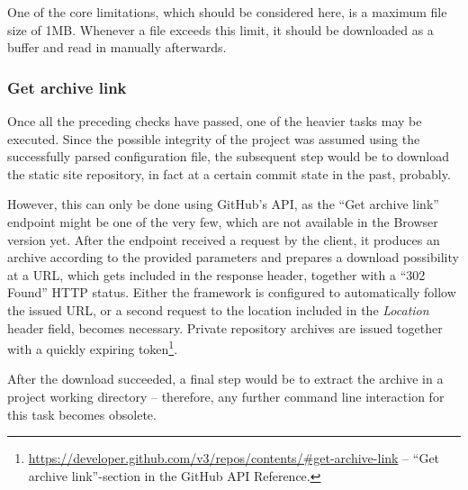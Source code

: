 One of the core limitations, which should be considered here, is a maximum file size of 1MB. Whenever a file exceeds this limit, it should be downloaded as a buffer and read in manually afterwards.

\subsubsection{Get archive link}
Once all the preceding checks have passed, one of the heavier tasks may be executed. Since the possible integrity of the project was assumed using the successfully parsed configuration file, the subsequent step would be to download the static site repository, in fact at a certain commit state in the past, probably.

However, this can only be done using GitHub's API, as the ``Get archive link'' endpoint might be one of the very few, which are not available in the Browser version yet. After the endpoint received a request by the client, it produces an archive according to the provided parameters and prepares a download possibility at a URL, which gets included in the response header, together with a ``302 Found'' HTTP status. Either the framework is configured to automatically follow the issued URL, or a second request to the location included in the \emph{Location} header field, becomes necessary. Private repository archives are issued together with a quickly expiring token\footnote{\url{https://developer.github.com/v3/repos/contents/\#get-archive-link} -- ``Get archive link''-section in the GitHub API Reference.}.

After the download succeeded, a final step would be to extract the archive in a project working directory -- therefore, any further command line interaction for this task becomes obsolete.
